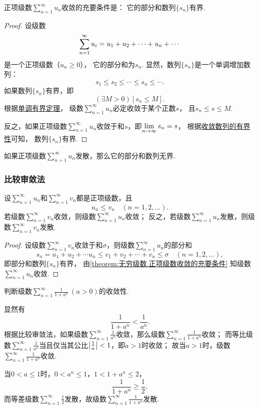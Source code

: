 \begin{theorem}\label{theorem:无穷级数.正项级数收敛的充要条件}
正项级数\(\sum\limits_{n=1}^\infty u_n\)收敛的充要条件是：
它的部分和数列\(\{s_n\}\)有界.
\begin{proof}
设级数\[
	\s u_i = u_1 + u_2 + \dotsb + u_n + \dotsb
\]是一个正项级数（\(u_n \geq 0\)），
它的部分和为\(s_n\).
显然，数列\(\{s_n\}\)是一个单调增加数列：\[
	s_1 \leq s_2 \leq \dotsb \leq s_n \leq \dotsb.
\]
如果数列\(\{s_n\}\)有界，即\[
	(\exists M>0)[s_n \leq M].
\]
根据\hyperref[theorem:极限.数列的单调有界定理]{单调有界定理}，
级数\(\sum\limits_{n=1}^\infty u_n\)必定收敛于某个正数\(s\)，
且\(s_n \leq s \leq M\).

反之，如果正项级数\(\sum\limits_{n=1}^\infty u_n\)收敛于和\(s\)，即\(\lim\limits_{n\to\infty} s_n = s\)，
根据\hyperref[theorem:极限.收敛数列的有界性]{收敛数列的有界性}可知，
数列\(\{s_n\}\)有界.
\end{proof}
\end{theorem}

\begin{proposition}
如果正项级数\(\sum\limits_{n=1}^\infty u_n\)发散，那么它的部分和数列无界.
\end{proposition}

\subsubsection{比较审敛法}
\begin{theorem}[比较审敛法]\label{theorem:无穷级数.正项级数的比较审敛法}
设\(\sum\limits_{n=1}^\infty u_n\)和\(\sum\limits_{n=1}^\infty v_n\)都是正项级数，且\[
u_n \leq v_n
\quad(n=1,2,\dotsc).
\]
若级数\(\sum\limits_{n=1}^\infty v_n\)收敛，则级数\(\sum\limits_{n=1}^\infty u_n\)收敛；
反之，若级数\(\sum\limits_{n=1}^\infty u_n\)发散，则级数\(\sum\limits_{n=1}^\infty v_n\)发散.
\begin{proof}
设级数\(\sum\limits_{n=1}^\infty v_n\)收敛于和\(\sigma\)，则级数\(\sum\limits_{n=1}^\infty u_n\)的部分和\[
s_n = u_1 + u_2 + \dotsb u_n
\leq
v_1 + v_2 + \dotsb + v_n \leq \sigma
\quad(n=1,2,\dotsc),
\]
即部分和数列\(\{s_n\}\)有界，
由\cref{theorem:无穷级数.正项级数收敛的充要条件} 知级数\(\sum\limits_{n=1}^\infty u_n\)收敛.
\end{proof}
\end{theorem}

\begin{example}
\def\s{\sum\limits_{n=1}^\infty }
判断级数\(\s \frac{1}{1+a^n}\ (a>0)\)的收敛性.
\begin{solution}
显然有\[
\frac{1}{1+a^n} < \frac{1}{a^n}.
\]根据比较审敛法，如果级数\(\s \frac{1}{a^n}\)收敛，那么级数\(\s \frac{1}{1+a^n}\)收敛；
而等比级数\(\s \frac{1}{a^n}\)当且仅当其公比\(\abs{\frac{1}{a}} < 1\)，即\(a > 1\)时收敛；
故当\(a > 1\)时，级数\(\s \frac{1}{1+a^n}\)收敛.

当\(0 < a \leq 1\)时，\(0 < a^n \leq 1\)，\(1 < 1 + a^n \leq 2\)，\[
\frac{1}{1+a^n} \geq \frac{1}{2},
\]而等差级数\(\s \frac{1}{2}\)发散，故级数\(\s \frac{1}{1+a^n}\)发散.
\end{solution}
\end{example}

